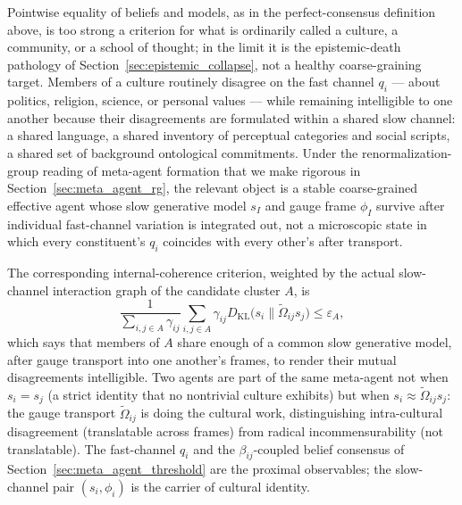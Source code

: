 \documentclass[11pt]{article}
\begin{document}
Pointwise equality of beliefs and models, as in the perfect-consensus definition above, is too strong a criterion for what is ordinarily called a culture, a community, or a school of thought; in the limit it is the epistemic-death pathology of Section~\ref{sec:epistemic_collapse}, not a healthy coarse-graining target. Members of a culture routinely disagree on the fast channel $q_i$ — about politics, religion, science, or personal values — while remaining intelligible to one another because their disagreements are formulated within a shared slow channel: a shared language, a shared inventory of perceptual categories and social scripts, a shared set of background ontological commitments. Under the renormalization-group reading of meta-agent formation that we make rigorous in Section~\ref{sec:meta_agent_rg}, the relevant object is a stable coarse-grained effective agent whose slow generative model $s_I$ and gauge frame $\phi_I$ survive after individual fast-channel variation is integrated out, not a microscopic state in which every constituent's $q_i$ coincides with every other's after transport.

The corresponding internal-coherence criterion, weighted by the actual slow-channel interaction graph of the candidate cluster $A$, is
\begin{equation}
\frac{1}{\sum_{i,j \in A}\gamma_{ij}}\sum_{i,j \in A}\gamma_{ij} D_{\mathrm{KL}}\big(s_i \big\| \tilde\Omega_{ij} s_j\big) \le \varepsilon_A,
\label{eq:culture_internal_coherence}
\end{equation}
which says that members of $A$ share enough of a common slow generative model, after gauge transport into one another's frames, to render their mutual disagreements intelligible. Two agents are part of the same meta-agent not when $s_i = s_j$ (a strict identity that no nontrivial culture exhibits) but when $s_i \approx \tilde\Omega_{ij} s_j$: the gauge transport $\tilde\Omega_{ij}$ is doing the cultural work, distinguishing intra-cultural disagreement (translatable across frames) from radical incommensurability (not translatable). The fast-channel $q_i$ and the $\beta_{ij}$-coupled belief consensus of Section~\ref{sec:meta_agent_threshold} are the proximal observables; the slow-channel pair $(s_i, \phi_i)$ is the carrier of cultural identity.
\end{document}
